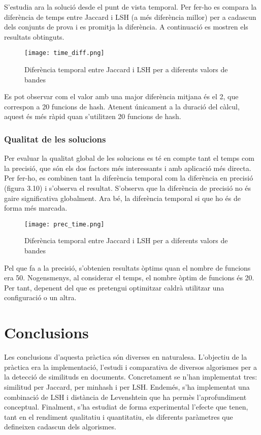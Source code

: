 \documentclass[catalan, 12pt]{report}
\begin{document}
S'estudia ara la solució desde el punt de vista temporal. Per fer-ho es compara la diferència de temps entre Jaccard i LSH (a més diferència millor) per a cadascun dels conjunts de prova i es promitja la diferència. A continuació es mostren els resultats obtinguts.

\begin{figure}[!h]
  \centering
  \texttt{[image: time\_diff.png]}
  \centering
  \caption[Caption for LOF]{Diferència temporal entre Jaccard i LSH per a diferents valors de bandes\protect}
\end{figure}


Es pot observar com el valor amb una major diferència mitjana és el 2, que correspon a 20 funcions de hash. Atenent únicament a la duració del càlcul, aquest és més ràpid quan s'utilitzen 20 funcions de hash. \newline

\newpage
\subsection{Qualitat de les solucions}
\vspace{20pt}
Per evaluar la qualitat global de les solucions es té en compte tant el temps com la precisió, que són els dos factors més interessants i amb aplicació més directa. Per fer-ho, es combinen tant la diferència temporal com la diferència en precisió (figura 3.10) i s'observa el resultat. S'observa que la diferència de precisió no és gaire significativa globalment. Ara bé, la diferència temporal si que ho és de forma més marcada.


\begin{figure}[!h]
  \centering
  \texttt{[image: prec\_time.png]}
  \centering
  \caption[Caption for LOF]{Diferència temporal entre Jaccard i LSH per a diferents valors de bandes\protect}
\end{figure}

Pel que fa a la precisió, s'obtenien resultats òptims quan el nombre de funcions era 50. Nogensmenys, al considerar el temps, el nombre òptim de funcions és 20. Per tant, depenent del que es pretengui optimitzar caldrà utilitzar una configuració o un altra.

\chapter{Conclusions}

Les conclusions d'aquesta pràctica són diverses en naturalesa. L'objectiu de la pràctica era la implementació, l'estudi i comparativa de diversos algorismes per a la detecció de similituds en documents. Concretament se n'han implementat tres: similitud per Jaccard, per minhash i per LSH. Endemés, s'ha implementat una combinació de LSH i distància de Levenshtein que ha permès l'aprofundiment conceptual. Finalment, s'ha estudiat de forma experimental l'efecte que tenen, tant en el rendiment qualitatiu i quantitatiu, els diferents paràmetres que defineixen cadascun dels algorismes. \newline
\end{document}
